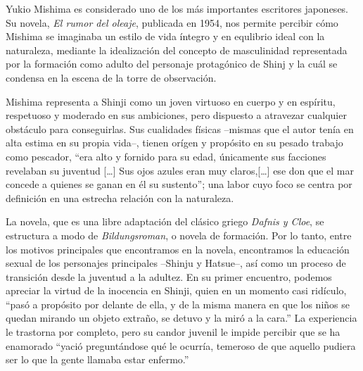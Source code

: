 Yukio Mishima es considerado uno de los más importantes escritores japoneses.
Su novela, \emph{El rumor del oleaje}, publicada en 1954,  nos permite percibir cómo Mishima se imaginaba un estilo de vida íntegro y en equlibrio ideal con la naturaleza, mediante la idealización del concepto de  masculinidad representada por la formación como adulto del personaje protagónico de Shinj y la cuál se condensa en la escena de la torre de observación.

Mishima representa a Shinji como un joven virtuoso en cuerpo y en espíritu, respetuoso y moderado en sus ambiciones, pero dispuesto a atravezar cualquier obstáculo para conseguirlas. Sus cualidades físicas --mismas que el autor tenía en alta estima en su propia vida--, tienen orígen y propósito en su pesado trabajo como pescador, ``era alto y fornido para su edad, únicamente sus facciones revelaban su juventud [\ldots] Sus ojos azules eran muy claros,[\ldots] ese don que el mar concede a quienes se ganan en él su sustento''; una labor cuyo foco se centra por definición en una estrecha relación con la naturaleza.

La novela, que es una libre adaptación del clásico griego \emph{Dafnis y Cloe}, se estructura a modo de \emph{Bildungsroman}, o novela de formación.
Por lo tanto, entre los motivos principales que encontramos en la novela, encontramos la educación sexual de los personajes principales --Shinju y Hatsue--, así como un proceso de transición desde la juventud a la adultez.
En su primer encuentro, podemos apreciar la virtud de la inocencia en Shinji, quien en un momento casi ridículo, ``pasó a propósito por delante de ella, y de la misma manera en que los niños se quedan mirando un objeto extraño, se detuvo y la miró a la cara.''%
La experiencia le trastorna por completo, pero su candor juvenil le impide percibir que se ha enamorado  ``yació preguntándose qué le ocurría, temeroso de que aquello pudiera ser lo que la gente llamaba estar enfermo.'' %

